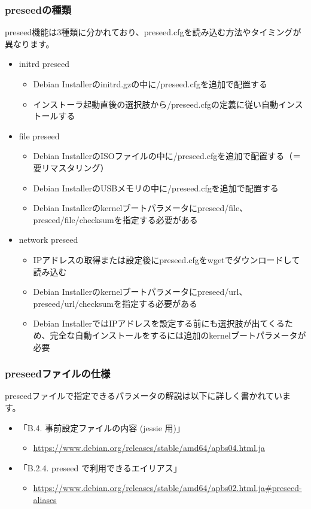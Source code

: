 \documentclass[mingoth,a4paper]{jsarticle}
\begin{document}
\subsubsection{preseedの種類}

preseed機能は3種類に分かれており、preseed.cfgを読み込む方法やタイミングが異なります。

\begin{itemize}
\item initrd preseed
  \begin{itemize}
  \item Debian Installerのinitrd.gzの中に/preseed.cfgを追加で配置する
  \item インストーラ起動直後の選択肢から/preseed.cfgの定義に従い自動インストールする
  \end{itemize}
\item file preseed
  \begin{itemize}
  \item Debian InstallerのISOファイルの中に/preseed.cfgを追加で配置する（＝要リマスタリング）
  \item Debian InstallerのUSBメモリの中に/preseed.cfgを追加で配置する
  \item Debian Installerのkernelブートパラメータにpreseed/file、preseed/file/checksumを指定する必要がある
  \end{itemize}
\item network preseed
  \begin{itemize}
  \item IPアドレスの取得または設定後にpreseed.cfgをwgetでダウンロードして読み込む
  \item Debian Installerのkernelブートパラメータにpreseed/url、preseed/url/checksumを指定する必要がある
  \item Debian InstallerではIPアドレスを設定する前にも選択肢が出てくるため、完全な自動インストールをするには追加のkernelブートパラメータが必要
  \end{itemize}
\end{itemize}


\subsubsection{preseedファイルの仕様}

preseedファイルで指定できるパラメータの解説は以下に詳しく書かれています。

\begin{itemize}
\item 「B.4. 事前設定ファイルの内容 (jessie 用)」
  \begin{itemize}
  \item \url{https://www.debian.org/releases/stable/amd64/apbs04.html.ja}
  \end{itemize}
  \item 「B.2.4. preseed で利用できるエイリアス」
  \begin{itemize}
  \item \url{https://www.debian.org/releases/stable/amd64/apbs02.html.ja#preseed-aliases}
  \end{itemize}
\end{itemize}
\end{document}
